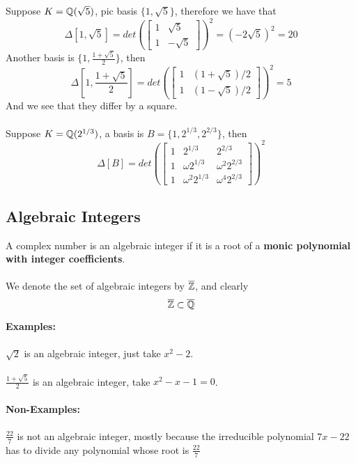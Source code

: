 \begin{example}
Suppose $K = \mathbb{Q}(\sqrt{5})$, pic basis $\{1, \sqrt{5}\}$, therefore we have that
\[\Delta[1, \sqrt{5}] = det(\begin{bmatrix} 1 & \sqrt{5} \\ 1 & -\sqrt{5}\end{bmatrix})^2 = (-2\sqrt{5})^2 = 20\]
Another basis is $\{1, \frac{1 + \sqrt{5}}{2}\}$, then
\[\Delta[1, \frac{1 + \sqrt{5}}{2}] = det(\begin{bmatrix} 1 & (1 + \sqrt{5})/2 \\ 1 & (1-\sqrt{5})/2 \end{bmatrix})^2 = 5\]
And we see that they differ by a square.\\\\
Suppose $K = \mathbb{Q}(2^{1/3})$, a basis is $B = \{1, 2^{1/3}, 2^{2/3}\}$, then
\[\Delta[B] = det(\begin{bmatrix} 
1 & 2^{1/3} & 2^{2/3}\\
1 & \omega 2^{1/3} & \omega^2 2^{2/3}\\
1 & \omega^2 2^{1/3} & \omega^4 2^{2/3}
\end{bmatrix})^2\]
\end{example}

\subsection{Algebraic Integers}

\begin{definition}
A complex number is an algebraic integer if it is a root of a \textbf{monic polynomial with integer coefficients}.\\\\
We denote the set of algebraic integers by $\overline{\mathbb{Z}}$, and clearly
\[\overline{\mathbb{Z}} \subset \overline{\mathbb{Q}}\]
\end{definition}

\begin{example}
{\bf Examples: }\\\\
$\sqrt{2}$ is an algebraic integer, just take $x^2 - 2$.\\\\
$\frac{1 + \sqrt{5}}{2}$ is an algebraic integer, take $x^2 - x - 1 = 0$.\\\\
{\bf Non-Examples: }\\\\
$\frac{22}{7}$ is not an algebraic integer, mostly because the irreducible polynomial $7x - 22$ has to divide any polynomial whose root is $\frac{22}{7}$
\end{example}


